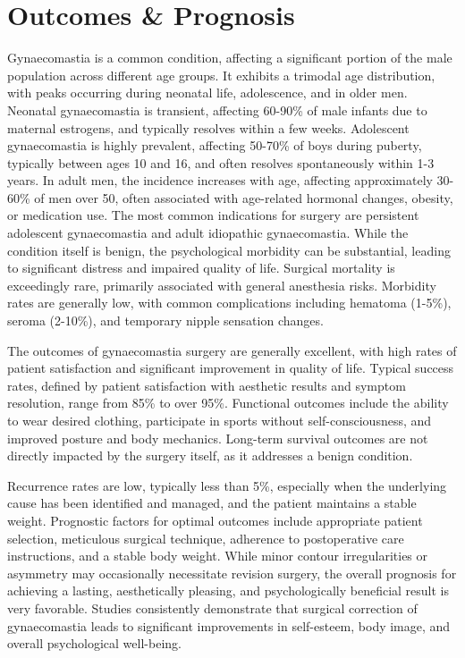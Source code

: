 \section*{Outcomes \& Prognosis}
Gynaecomastia is a common condition, affecting a significant portion of the male population across different age groups. It exhibits a trimodal age distribution, with peaks occurring during neonatal life, adolescence, and in older men. Neonatal gynaecomastia is transient, affecting 60-90\% of male infants due to maternal estrogens, and typically resolves within a few weeks. Adolescent gynaecomastia is highly prevalent, affecting 50-70\% of boys during puberty, typically between ages 10 and 16, and often resolves spontaneously within 1-3 years. In adult men, the incidence increases with age, affecting approximately 30-60\% of men over 50, often associated with age-related hormonal changes, obesity, or medication use. The most common indications for surgery are persistent adolescent gynaecomastia and adult idiopathic gynaecomastia. While the condition itself is benign, the psychological morbidity can be substantial, leading to significant distress and impaired quality of life. Surgical mortality is exceedingly rare, primarily associated with general anesthesia risks. Morbidity rates are generally low, with common complications including hematoma (1-5\%), seroma (2-10\%), and temporary nipple sensation changes.

The outcomes of gynaecomastia surgery are generally excellent, with high rates of patient satisfaction and significant improvement in quality of life. Typical success rates, defined by patient satisfaction with aesthetic results and symptom resolution, range from 85\% to over 95\%. Functional outcomes include the ability to wear desired clothing, participate in sports without self-consciousness, and improved posture and body mechanics. Long-term survival outcomes are not directly impacted by the surgery itself, as it addresses a benign condition.

Recurrence rates are low, typically less than 5\%, especially when the underlying cause has been identified and managed, and the patient maintains a stable weight. Prognostic factors for optimal outcomes include appropriate patient selection, meticulous surgical technique, adherence to postoperative care instructions, and a stable body weight. While minor contour irregularities or asymmetry may occasionally necessitate revision surgery, the overall prognosis for achieving a lasting, aesthetically pleasing, and psychologically beneficial result is very favorable. Studies consistently demonstrate that surgical correction of gynaecomastia leads to significant improvements in self-esteem, body image, and overall psychological well-being.

